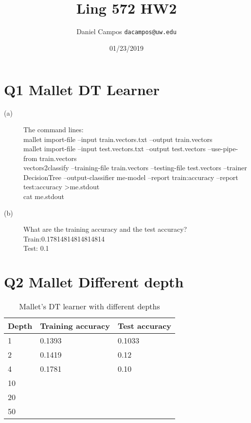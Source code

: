 \documentclass[11pt]{article}
\begin{document}
\title{Ling 572 HW2 }
\author{Daniel Campos  \tt {dacampos@uw.edu}}
\date{01/23/2019}
\maketitle 
\vspace{0.3 in}
\hspace{-0.3in}
\section{  Q1 Mallet DT Learner}
\begin{description}
\item [(a)] The command lines:\\ 
mallet import-file --input train.vectors.txt --output train.vectors\\
mallet import-file --input test.vectors.txt --output test.vectors --use-pipe-from train.vectors \\
vectors2classify --training-file train.vectors --testing-file test.vectors --trainer DecisionTree --output-classifier me-model --report train:accuracy --report test:accuracy \textgreater  me.stdout \\
cat me.stdout
\item [(b)] What are the training accuracy and the test accuracy? \\
Train:0.17814814814814814 \\
Test: 0.1
\end{description}

\section{ Q2 Mallet Different depth}
\begin{table}[h]
\centering
\caption{Mallet's DT learner with different depths}
\label{table1}
\begin{tabular}{|l|l|l|} \hline
Depth   & Training accuracy & Test accuracy \\ \hline
1       & 0.1393 & 0.1033  \\ \hline
2       & 0.1419 & 0.12 \\ \hline
4       &  0.1781 & 0.10 \\ \hline
10      &    &  \\ \hline
20      &    &  \\ \hline
50      &    &  \\ \hline
\end{tabular}
\end{table}
\end{document}
